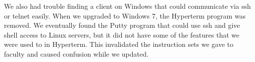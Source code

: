 We also had trouble finding a client on Windows that could communicate via ssh or telnet easily.  When we upgraded to Windows 7, the Hyperterm program was removed.  We eventually found the Putty program that could use ssh and give shell access to Linux servers, but it did not have some of the features that we were used to in Hyperterm.  This invalidated the instruction sets we gave to faculty and caused confusion while we updated.  
